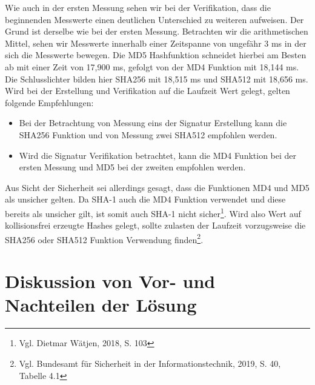 Wie auch in der ersten Messung sehen wir bei der Verifikation, dass die beginnenden Messwerte einen deutlichen Unterschied zu weiteren aufweisen. Der Grund ist derselbe wie bei der ersten Messung. Betrachten wir die arithmetischen Mittel, sehen wir Messwerte innerhalb einer Zeitspanne von ungefähr 3 ms in der sich die Messwerte bewegen. Die MD5 Hashfunktion schneidet hierbei am Besten ab mit einer Zeit von 17,900 ms, gefolgt von der MD4 Funktion mit 18,144 ms. Die Schlusslichter bilden hier SHA256 mit 18,515 ms und SHA512 mit 18,656 ms.\\

Wird bei der Erstellung und Verifikation auf die Laufzeit Wert gelegt, gelten folgende Empfehlungen:
\begin{itemize}
	\item Bei der Betrachtung von Messung eins der Signatur Erstellung kann die SHA256 Funktion und von Messung zwei SHA512 empfohlen werden.
	\item Wird die Signatur Verifikation betrachtet, kann die MD4 Funktion bei der ersten Messung und MD5 bei der zweiten empfohlen werden.
\end{itemize}
Aus Sicht der Sicherheit sei allerdings gesagt, dass die Funktionen MD4 und MD5 als unsicher gelten. Da SHA-1 auch die MD4 Funktion verwendet und diese bereits als unsicher gilt, ist somit auch SHA-1 nicht sicher\footnote{Vgl. Dietmar Wätjen, 2018, S. 103}. Wird also Wert auf kollisionsfrei erzeugte Hashes gelegt, sollte zulasten der Laufzeit vorzugsweise die SHA256 oder SHA512 Funktion Verwendung finden\footnote{Vgl. Bundesamt für Sicherheit in der Informationstechnik, 2019, S. 40, Tabelle 4.1}.
\section{Diskussion von Vor- und Nachteilen der Lösung}
